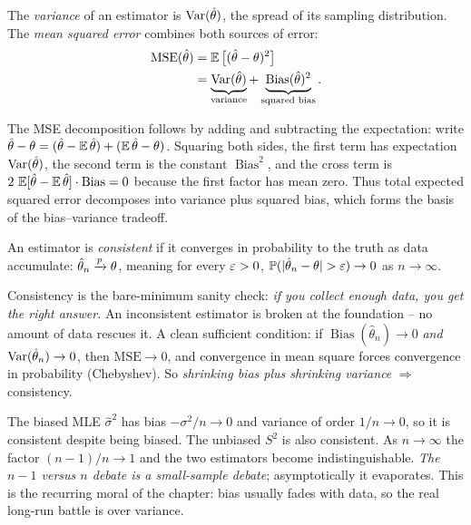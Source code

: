 \begin{definition}
\label{ch30:def-mse}
The \emph{variance} of an estimator is $\operatorname{Var}(\hat\theta)$, the spread of its
sampling distribution. The \emph{mean squared error} combines both sources of
error:
\begin{align*}
  \mathrm{MSE}(\hat\theta) &= \operatorname{\mathbb{E}}\big[(\hat\theta-\theta)^2\big] \\
  &= \underbrace{\operatorname{Var}(\hat\theta)}_{\text{variance}}
  + \underbrace{\operatorname{Bias}(\hat\theta)^2}_{\text{squared bias}}.
\end{align*}
\end{definition}

\begin{whybox}
The MSE decomposition follows by adding and subtracting the expectation:
write $\hat\theta-\theta = (\hat\theta-\operatorname{\mathbb{E}}\hat\theta)+(\operatorname{\mathbb{E}}\hat\theta-\theta)$. Squaring both sides,
the first term has expectation $\operatorname{Var}(\hat\theta)$, the second term is
the constant $\operatorname{Bias}^2$, and the cross term is
$2\,\operatorname{\mathbb{E}}[\hat\theta-\operatorname{\mathbb{E}}\hat\theta]\cdot\operatorname{Bias}=0$ because the first
factor has mean zero. Thus total expected squared error decomposes into
variance plus squared bias, which forms the basis of the bias--variance tradeoff.
\end{whybox}

\begin{definition}[Consistency]
\label{ch30:def-consistency}
An estimator is \emph{consistent} if it converges in probability to the truth as
data accumulate:
$\hat\theta_n \xrightarrow{p} \theta$, meaning for every $\varepsilon>0$,
$\operatorname{\mathbb{P}}(\lvert\hat\theta_n - \theta\rvert > \varepsilon)\to 0$ as $n\to\infty$.
\end{definition}

\begin{intuitionbox}
Consistency is the bare-minimum sanity check: \emph{if you collect enough data,
you get the right answer.} An inconsistent estimator is broken at the
foundation -- no amount of data rescues it. A clean sufficient condition: if
$\operatorname{Bias}(\hat\theta_n)\to 0$ \emph{and}
$\operatorname{Var}(\hat\theta_n)\to 0$, then $\mathrm{MSE}\to 0$, and convergence in mean
square forces convergence in probability (Chebyshev). So \emph{shrinking bias
plus shrinking variance} $\Rightarrow$ consistency.
\end{intuitionbox}

\begin{example}
\label{ch30:ex-consistent-var}
The biased MLE $\hat\sigma^2$ has bias $-\sigma^2/n \to 0$ and variance of order
$1/n \to 0$, so it is consistent despite being biased. The unbiased $S^2$ is
also consistent. As $n\to\infty$ the factor $(n-1)/n\to 1$ and the two estimators
become indistinguishable. \emph{The $n-1$ versus $n$ debate is a small-sample
debate}; asymptotically it evaporates. This is the recurring moral of the
chapter: bias usually fades with data, so the real long-run battle is over
variance.
\end{example}

